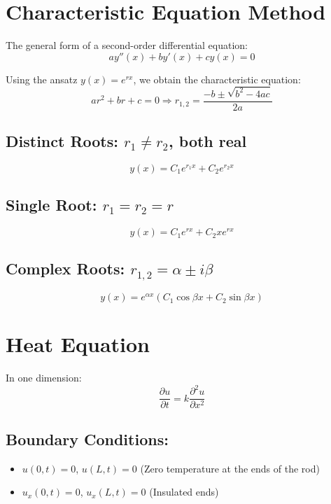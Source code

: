 \documentclass[a4paper,12pt]{article}
\begin{document}
\section*{Characteristic Equation Method}
The general form of a second-order differential equation:
\begin{equation*}
    a y''(x) + b y'(x) + c y(x) = 0
\end{equation*}

Using the ansatz $y(x) = e^{rx}$, we obtain the characteristic equation:
\begin{equation*}
    a r^2 + b r + c = 0 \Rightarrow r_{1,2} = \frac{-b \pm \sqrt{b^2 - 4ac}}{2a}
\end{equation*}

\subsection*{Distinct Roots: $r_1 \neq r_2$, both real}
\begin{equation*}
    y(x) = C_1 e^{r_1 x} + C_2 e^{r_2 x}
\end{equation*}

\subsection*{Single Root: $r_1 = r_2 = r$}
\begin{equation*}
    y(x) = C_1 e^{r x} + C_2 x e^{r x}
\end{equation*}

\subsection*{Complex Roots: $r_{1,2} = \alpha \pm i\beta$}
\begin{equation*}
    y(x) = e^{\alpha x} \left( C_1 \cos \beta x + C_2 \sin \beta x \right)
\end{equation*}
\newpage
\section*{Heat Equation}
In one dimension:
\begin{equation*}
    \frac{\partial u}{\partial t} = k \frac{\partial^2 u}{\partial x^2}
\end{equation*}

\subsection*{Boundary Conditions:}
\begin{itemize}
    \item $u(0,t) = 0$, $u(L,t) = 0$ (Zero temperature at the ends of the rod)
    \item $u_x(0,t) = 0$, $u_x(L,t) = 0$ (Insulated ends)
\end{itemize}
\end{document}

